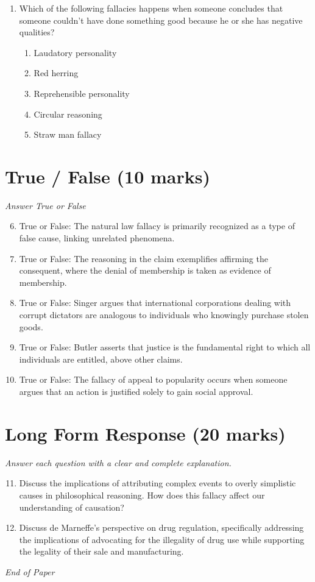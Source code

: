\documentclass[12pt]{article}
\begin{document}
\begin{enumerate}[label=\arabic*.]
\begin{enumerate}[label=(\alph*)]
    \item retaliatory
    \item punitive
    \item compensatory
\end{enumerate}
\item Which of the following fallacies happens when someone concludes that someone couldn't have done something good because he or she has negative qualities?
\begin{enumerate}[label=(\alph*)]
    \item Laudatory personality
    \item Red herring
    \item Reprehensible personality
    \item Circular reasoning
    \item Straw man fallacy
\end{enumerate}
\end{enumerate}

\section*{True / False (10 marks)}
\textit{Answer True or False}
\begin{enumerate}[label=\arabic*.]
\setcounter{enumi}{5}
\item True or False: The natural law fallacy is primarily recognized as a type of false cause, linking unrelated phenomena.
\item True or False: The reasoning in the claim exemplifies affirming the consequent, where the denial of membership is taken as evidence of membership.
\item True or False: Singer argues that international corporations dealing with corrupt dictators are analogous to individuals who knowingly purchase stolen goods.
\item True or False: Butler asserts that justice is the fundamental right to which all individuals are entitled, above other claims.
\item True or False: The fallacy of appeal to popularity occurs when someone argues that an action is justified solely to gain social approval.
\end{enumerate}

\section*{Long Form Response (20 marks)}
\textit{Answer each question with a clear and complete explanation.}
\begin{enumerate}[label=\arabic*.]
\setcounter{enumi}{10}
\item Discuss the implications of attributing complex events to overly simplistic causes in philosophical reasoning. How does this fallacy affect our understanding of causation?
\item Discuss de Marneffe's perspective on drug regulation, specifically addressing the implications of advocating for the illegality of drug use while supporting the legality of their sale and manufacturing.
\end{enumerate}

\vfill
\noindent\textit{End of Paper}
\end{document}
